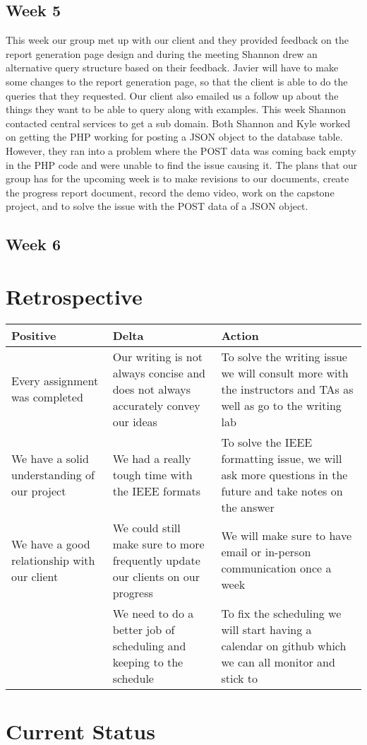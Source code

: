 \documentclass[letterpaper,10pt,serif, draftclsnofoot,onecolumn, compsoc, titlepage]{IEEEtran}
\begin{document}
\subsection{Week 5}
This week our group met up with our client and they provided feedback on the report generation page design and during the meeting Shannon drew an alternative query structure based on their feedback.
Javier will have to make some changes to the report generation page, so that the client is able to do the queries that they requested.
Our client also emailed us a follow up about the things they want to be able to query along with examples.
This week Shannon contacted central services to get a sub domain.
Both Shannon and Kyle worked on getting the PHP working for posting a JSON object to the database table.
However, they ran into a problem where the POST data was coming back empty in the PHP code and were unable to find the issue causing it.
The plans that our group has for the upcoming week is to make revisions to our documents, create the progress report document, record the demo video, work on the capstone project, and to solve the issue with the POST data of a JSON object. 

\subsection{Week 6} 


\section{Retrospective}
\begin{center}
    \begin{tabular}{ | p{5cm} | p{5cm} | p{5cm} |}
    \hline
     Positive & Delta & Action \\ \hline
  	Every assignment was completed & Our writing is not always concise and does not always accurately convey our ideas & To solve the writing issue we will consult more with the instructors and TAs as well as go to the writing lab \\\hline
	We have a solid understanding of our project & We had a really tough time with the IEEE formats & To solve the IEEE formatting issue, we will ask more questions in the future and take notes on the answer \\ \hline
	We have a good relationship with our client & We could still make sure to more frequently update our clients on our progress & We will make sure to have email or in-person communication once a week \\ \hline
	&We need to do a better job of scheduling and keeping to the schedule& To fix the scheduling we will start having a calendar on github which we can all monitor and stick to \\ \hline
    \end{tabular}
\end{center}

\section{Current Status}
\end{document}
